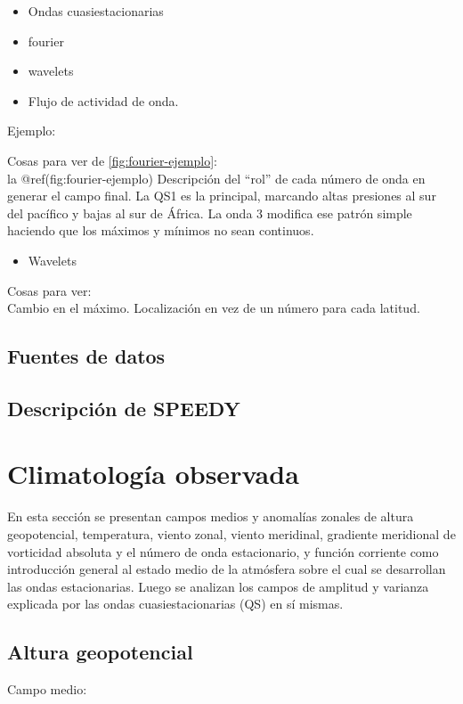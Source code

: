 \documentclass[spanish,a4paper,12pt,oneside]{book}
\providecommand{\tightlist}{%
  \setlength{\itemsep}{0pt}\setlength{\parskip}{0pt}}
\begin{document}
\begin{itemize}
\tightlist
\item
  Ondas cuasiestacionarias
\item
  fourier
\item
  wavelets
\item
  Flujo de actividad de onda.
\end{itemize}


Ejemplo:

Cosas para ver de \autoref{fig:fourier-ejemplo}:\\
la @ref(fig:fourier-ejemplo) Descripción del ``rol'' de cada número de
onda en generar el campo final. La QS1 es la principal, marcando altas
presiones al sur del pacífico y bajas al sur de África. La onda 3
modifica ese patrón simple haciendo que los máximos y mínimos no sean
continuos.

\begin{itemize}
\tightlist
\item
  Wavelets
\end{itemize}

\citet{Loon1972}

Cosas para ver:\\
Cambio en el máximo. Localización en vez de un número para cada latitud.

\section{Fuentes de datos}\label{fuentes-de-datos}

\section{Descripción de SPEEDY}\label{descripcion-de-speedy}

\chapter{Climatología observada}\label{climatologia-observada}

En esta sección se presentan campos medios y anomalías zonales de altura
geopotencial, temperatura, viento zonal, viento meridinal, gradiente
meridional de vorticidad absoluta y el número de onda estacionario, y
función corriente como introducción general al estado medio de la
atmósfera sobre el cual se desarrollan las ondas estacionarias. Luego se
analizan los campos de amplitud y varianza explicada por las ondas
cuasiestacionarias (QS) en sí mismas.

\section{Altura geopotencial}\label{altura-geopotencial}

Campo medio:


\end{document}
